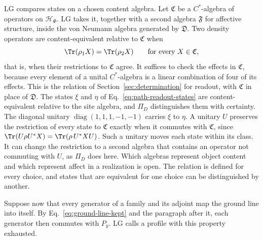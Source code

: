LG compares states on a chosen content algebra. Let $\mathfrak C$ be a $C^*$-algebra of operators on $\mathcal H_\Phi$. LG takes it, together with a second algebra $\mathfrak F$ for affective structure, inside the von Neumann algebra generated by $\mathfrak D$. Two density operators are content-equivalent relative to $\mathfrak C$ when
\begin{equation}
 \Tr(\rho_1X)=\Tr(\rho_2X)\qquad\text{for every }X\in\mathfrak C ,
 \label{eq:family-content-equivalence}
\end{equation}
that is, when their restrictions to $\mathfrak C$ agree. It suffices to check the effects in $\mathfrak C$, because every element of a unital $C^*$-algebra is a linear combination of four of its effects. This is the relation of Section~\ref{sec:determination} for readout, with $\mathfrak C$ in place of $\mathfrak D$. The states $\xi$ and $\eta$ of Eq.~\eqref{eq:path-readout-states} are content-equivalent relative to the site algebra, and $\Pi_D$ distinguishes them with certainty. The diagonal unitary $\operatorname{diag}(1,1,1,-1,-1)$ carries $\xi$ to $\eta$. A unitary $U$ preserves the restriction of every state to $\mathfrak C$ exactly when it commutes with $\mathfrak C$, since $\Tr(U\rho U^*X)=\Tr(\rho\,U^*XU)$. Such a unitary moves each state within its class. It can change the restriction to a second algebra that contains an operator not commuting with $U$, as $\Pi_D$ does here. Which algebras represent object content and which represent affect in a realization is open. The relation is defined for every choice, and states that are equivalent for one choice can be distinguished by another.

Suppose now that every generator of a family and its adjoint map the ground line into itself. By Eq.~\eqref{eq:ground-line-kept} and the paragraph after it, each generator then commutes with $P_y$. LG calls a profile with this property exhausted.

